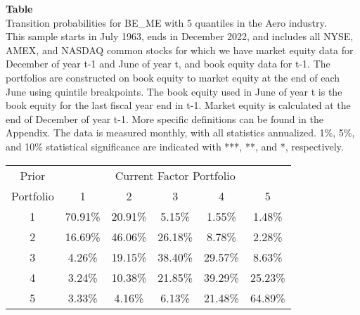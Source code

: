 \begin{table*}[ht!]
\raggedright
{}
\label{tab: transition_probs_BE_ME_Aero_with_5_quantiles}
\textbf{Table \thetable} \\
Transition probabilities for BE_ME with 5 quantiles in the Aero industry. \\
\hspace*{1em}This sample starts in July 1963, ends in December 2022, and includes all NYSE, AMEX, and NASDAQ common stocks for which we have market equity data for December of year t-1 and June of year t, and book equity data for t-1. The portfolios are constructed on book equity to market equity at the end of each June using quintile breakpoints.  The book equity used in June of year t is the book equity for the last fiscal year end in t-1.  Market equity is calculated at the end of December of year t-1.  More specific definitions can be found in the Appendix.  The data is measured monthly, with all statistics annualized.  1\%, 5\%, and 10\% statistical significance are indicated with ***, **, and *, respectively. \\
\vspace{0.5em}
\centering
\begin{adjustbox}{max width=\textwidth}
\begin{tabular}{@{}cccccc@{}}
\toprule
Prior & \multicolumn{5}{c}{Current Factor Portfolio} \\
Portfolio & 1 & 2 & 3 & 4 & 5 \\
\midrule
1 & 70.91\% & 20.91\% & 5.15\% & 1.55\% & 1.48\% \\
2 & 16.69\% & 46.06\% & 26.18\% & 8.78\% & 2.28\% \\
3 & 4.26\% & 19.15\% & 38.40\% & 29.57\% & 8.63\% \\
4 & 3.24\% & 10.38\% & 21.85\% & 39.29\% & 25.23\% \\
5 & 3.33\% & 4.16\% & 6.13\% & 21.48\% & 64.89\% \\
\bottomrule
\end{tabular}
\end{adjustbox}
\end{table*}
